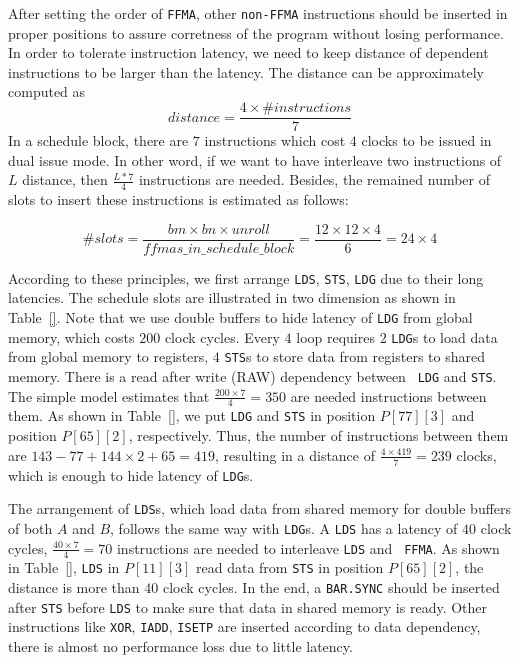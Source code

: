 \documentclass{sig-alternate-05-2015}
\begin{document}
After setting the order of {\tt FFMA}, other {\tt non-FFMA} instructions should be inserted in proper positions to assure
corretness of the program without losing performance. In order to tolerate instruction latency, we need to keep distance of dependent instructions to be larger than the latency. The distance can be approximately computed as
\begin{displaymath}
distance = \frac{4\times\#instructions}{7}
\end{displaymath}
In a schedule block, there are $7$ instructions which cost $4$ clocks to be issued in dual issue mode. In other word, if we want to have interleave
two instructions of $L$ distance, then $\frac{L*7}{4}$ instructions are needed. Besides, the remained number of slots to insert these instructions is estimated as follows:

\begin{displaymath}
\#slots = \frac{bm\times bn\times unroll}{ffmas\_in\_schedule\_block}=\frac{12\times 12\times 4}{6}=24\times 4
\end{displaymath}

According to these principles, we first arrange {\tt LDS}, {\tt STS}, {\tt LDG} due to their long latencies. The schedule slots are illustrated in two dimension as shown in Table~\ref{}.
Note that we use double buffers to hide latency of {\tt LDG} from global memory, which costs $200$ clock cycles.
Every $4$ loop requires $2$ {\tt LDG}s to load data from global memory to registers, $4$ {\tt STS}s to store data from registers to shared memory. There is a read after write (RAW) dependency between {\tt
LDG} and {\tt STS}. The simple model estimates that $\frac{200\times 7}{4} = 350$ are needed instructions between them. As shown in Table~\ref{}, we put {\tt LDG} and  {\tt STS} in position $P[77][3]$ and position $P[65][2]$, respectively. Thus, the number of instructions between them are $143-77 + 144\times 2 +
65=419$, resulting in a distance of $\frac{4\times 419}{7}=239$ clocks, which is enough to hide latency of {\tt LDG}s.

The arrangement of {\tt LDS}s, which load data from shared memory for double buffers of both $A$ and $B$, follows the same way with {\tt LDG}s.
A {\tt LDS} has a latency of $40$ clock cycles, $\frac{40\times 7}{4}=70$ instructions are needed to interleave {\tt LDS} and {\tt
FFMA}. As shown in Table~\ref{}, {\tt LDS} in $P[11][3]$ read data from {\tt STS} in position $P[65][2]$, the distance is more than $40$ clock
cycles. In the end, a {\tt BAR.SYNC} should be inserted after {\tt STS} before {\tt LDS} to make sure that data in shared memory is ready. Other instructions like {\tt XOR},
{\tt IADD}, {\tt ISETP} are inserted according to data dependency, there is almost no performance loss due to little latency.
\end{document}
